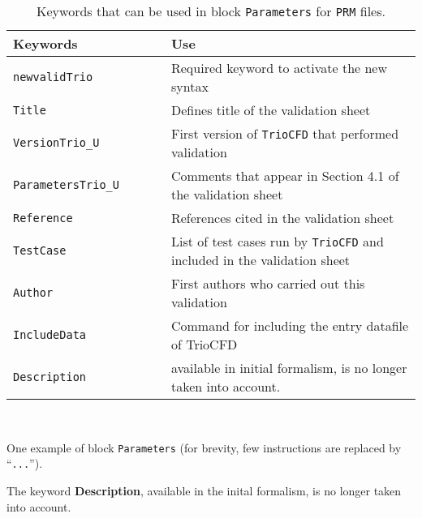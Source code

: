 \setlength{\tabcolsep}{0.1cm}
\renewcommand{\arraystretch}{1.25}
\begin{table}[H]
\begin{centering}
\begin{tabular}{lll}
\hline 
\textbf{Keywords} & $\qquad$ & \textbf{Use}\tabularnewline
\hline 
\texttt{newvalidTrio} &  & Required keyword to activate the new syntax\tabularnewline
\texttt{Title} &  & Defines title of the validation sheet\tabularnewline
\texttt{VersionTrio\_U} &  & First version of \texttt{TrioCFD} that performed validation\tabularnewline
\texttt{ParametersTrio\_U} &  & Comments that appear in Section 4.1 of the validation sheet\tabularnewline
\texttt{Reference} &  & References cited in the validation sheet\tabularnewline
\texttt{TestCase} &  & List of test cases run by \texttt{TrioCFD} and included in the validation
sheet\tabularnewline
\texttt{Author} &  & First authors who carried out this validation\tabularnewline
\texttt{IncludeData} &  & Command for including the entry datafile of TrioCFD\tabularnewline
\texttt{Description} &  & available in initial formalism, is no longer taken into account.\tabularnewline
\hline 
\end{tabular}
\par\end{centering}
\begin{center}\caption{\label{tab:Required-keywords-in}Keywords that can be used in block
\texttt{Parameters} for \texttt{PRM} files.}\end{center}
\end{table}

~
\begin{center}
\begin{algorithm}[H]
{\footnotesize{}}{\footnotesize\par}

\caption{\label{alg:Example-of-use}One example of block \texttt{Parameters}
(for brevity, few instructions are replaced by ``\texttt{...}'').}
\end{algorithm}\end{center}

The keyword \textbf{Description}, available in the inital formalism, is no longer taken into account.\smallskip\newline

